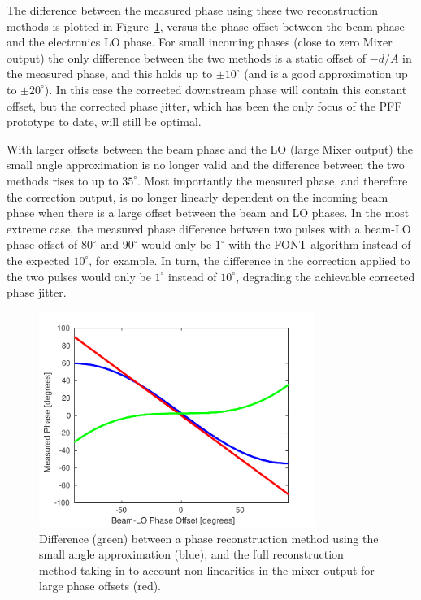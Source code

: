 The difference between the measured phase using these two reconstruction methods is plotted in Figure~\ref{f:phaseRecDiff}, versus the phase offset between the beam phase and the electronics LO phase. For small incoming phases (close to zero Mixer output) the only difference between the two methods is a static offset of \(-d/A\) in the measured phase, and this holds up to \(\pm10^\circ\) (and is a good approximation up to \(\pm20^\circ\)). In this case the corrected downstream phase will contain this constant offset, but the corrected phase jitter, which has been the only focus of the PFF prototype to date, will still be optimal. 

With larger offsets between the beam phase and the LO (large Mixer output) the small angle approximation is no longer valid and the difference between the two methods rises to up to \(35^\circ\). Most importantly the measured phase, and therefore the correction output, is no longer linearly dependent on the incoming beam phase when there is a large offset between the beam and LO phases. In the most extreme case, the measured phase difference between two pulses with a beam-LO phase offset of \(80^\circ\) and \(90^\circ\) would only be \(1^\circ\) with the FONT algorithm instead of the expected \(10^\circ\), for example. In turn, the difference in the correction applied to the two pulses would only be \(1^\circ\) instead of \(10^\circ\), degrading the achievable corrected phase jitter.

\begin{figure}
  \centering
  \includegraphics[width=0.8\textwidth]{Figures/commissioning/phaseRecDiff}
  \caption{Difference (green) between a phase reconstruction method using the small angle approximation (blue), and the full reconstruction method taking in to account non-linearities in the mixer output for large phase offsets (red).}
  \label{f:phaseRecDiff}
\end{figure}

